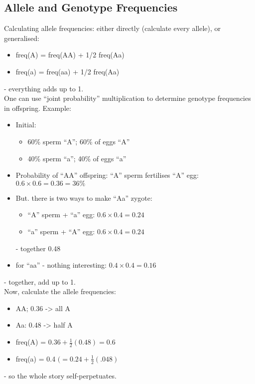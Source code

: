 \documentclass{scrartcl}
\begin{document}
\subsection{Allele and Genotype Frequencies}
\label{sec:06-1-1}
Calculating allele frequencies: either directly (calculate every allele), or generalised:
\begin{itemize}
\item freq(A) = freq(AA) + 1/2 freq(Aa)
\item freq(a) = freq(aa) + 1/2 freq(Aa)
\end{itemize}
- everything adds up to 1.\\
One can use ``joint probability'' multiplication to determine genotype frequencies in offspring. Example:
\begin{itemize}
\item Initial:
  \begin{itemize}
  \item 60\% sperm ``A''; 60\% of eggs ``A''
  \item 40\% sperm ``a''; 40\% of eggs ``a''
  \end{itemize}
\item Probability of ``AA'' offspring: ``A'' sperm fertilises ``A'' egg: $0.6 \times 0.6 = 0.36 = 36\%$
\item But. there is two ways to make ``Aa'' zygote:
  \begin{itemize}
  \item ``A'' sperm + ``a'' egg: $0.6 \times 0.4 = 0.24$
  \item ``a'' sperm + ``A'' egg: $0.6 \times 0.4 = 0.24$
  \end{itemize}
  - together 0.48
\item for ``aa'' - nothing interesting: $0.4 \times 0.4 = 0.16$
\end{itemize}
- together, add up to 1.\\
Now, calculate the allele frequencies:\\
\begin{itemize}
\item AA; 0.36 -> all A
\item Aa: 0.48 -> half A
\item freq(A) = $0.36 + \frac12(0.48) = 0.6$
\item freq(a) = 0.4 $(=0.24 + \frac12(.048)$
\end{itemize}
- so the whole story self-perpetuates.

\end{document}
